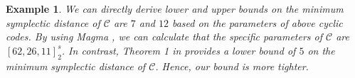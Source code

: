 \documentclass[journal]{IEEEtran}
\newtheorem{example}{Example}
\begin{document}
\begin{example}
	
	We can directly derive lower and upper bounds on the minimum symplectic distance of $\mathscr{C}$ are $7$ and $12$ based on the parameters of above cyclic codes. By using Magma \cite{bosma1997magma}, we can calculate that the specific parameters of $\mathscr{C}$ are $\left[62,26,11\right]_2^s$. 
 In contrast, Theorem 1 in \cite{GuanAdditive2023} provides a lower bound of $5$ on the minimum symplectic distance of $\mathscr{C}$. Hence, our bound is more tighter. 
\end{example}
\end{document}
